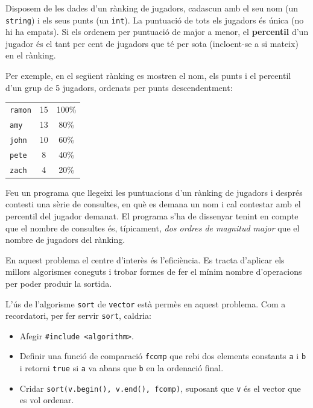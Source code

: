 
\Statement

Disposem de les dades d'un rànking de jugadors, cadascun amb el seu nom (un \verb|string|) i els seus punts (un \verb|int|). La puntuació de tots els jugadors és única (no hi ha empats). Si els ordenem per puntuació de major a menor, el \textbf{percentil} d'un jugador és el tant per cent de jugadors que té per sota (incloent-se a si mateix) en el rànking.

\medskip

Per exemple, en el següent rànking es mostren el nom, els punts i el percentil d'un grup de 5 jugadors, ordenats per punts descendentment:

\medskip 

\begin{tabular}{lcc}
    \verb|ramon| & 15 & 100\% \\
    \verb|amy| & 13 & 80\% \\
    \verb|john| & 10 & 60\% \\
    \verb|pete| & 8 & 40\% \\
    \verb|zach| & 4 & 20\% \\
\end{tabular}

\medskip

Feu un programa que llegeixi les puntuacions d'un rànking de jugadors i després contesti una sèrie de consultes, en què es demana un nom i cal contestar amb el percentil del jugador demanat. El programa s'ha de dissenyar tenint en compte que el nombre de consultes és, típicament, \emph{dos ordres de magnitud major} que el nombre de jugadors del rànking.

\Observation

En aquest problema el centre d'interès és l'eficiència. Es tracta d'aplicar els millors algorismes coneguts i trobar formes de fer el mínim nombre d'operacions per poder produir la sortida.

\medskip

L'ús de l'algorisme \verb|sort| de \verb|vector| està permès en aquest problema. Com a recordatori, per fer servir \verb|sort|, caldria:
\begin{itemize}
\item Afegir \verb|#include <algorithm>|.
\item Definir una funció de comparació \verb|fcomp| que rebi dos elements constants \verb|a| i \verb|b| i retorni \verb|true| si \verb|a| va abans que \verb|b| en la ordenació final.
\item Cridar \verb|sort(v.begin(), v.end(), fcomp)|, suposant que \verb|v| és el vector que es vol ordenar.
\end{itemize}

